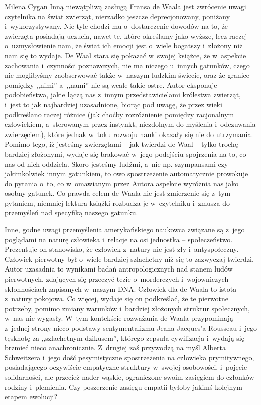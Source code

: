 \begin{recplenv}{Milena Cygan}
Inną niewątpliwą zasługą Fransa de Waala jest zwrócenie uwagi czytelnika na świat zwierząt, nierzadko jeszcze
deprecjonowany, poniżany i~wykorzystywany. Nie tyle chodzi mu o~dostarczenie dowodów na to, że zwierzęta posiadają
uczucia, nawet te, które określamy jako wyższe, lecz raczej o~uzmysłowienie nam, że świat ich emocji jest o~wiele
bogatszy i~złożony niż nam się to wydaje. De Waal stara się pokazać w~swojej książce, że w~aspekcie
zachowania i~czynności poznawczych, nie ma niczego u~innych gatunków, czego nie moglibyśmy zaobserwować także w~naszym ludzkim
świecie, oraz że granice pomiędzy ,,nimi'' a~,,nami'' nie są wcale takie ostre. Autor eksponuje podobieństwa, jakie łączą
nas z~innym przedstawicielami królestwa zwierząt, i~jest to jak najbardziej uzasadnione, biorąc pod uwagę, że przez
wieki podkreślano raczej różnice (jak choćby rozróżnienie pomiędzy racjonalnym człowiekiem, a~sterowanym przez
instynkt, niezdolnym do myślenia i~odczuwania zwierzęciem), które jednak w~toku rozwoju nauki okazały się nie do
utrzymania. Pomimo tego, iż jesteśmy zwierzętami -- jak twierdzi de Waal -- tylko trochę bardziej złożonymi, wydaje się
brakować w~jego podejściu spojrzenia na to, co nas od nich oddziela. Skoro jesteśmy ludźmi, a~nie np. szympansami czy
jakimkolwiek innym gatunkiem, to owo spostrzeżenie automatycznie prowokuje do pytania o~to, co w~omawianym przez Autora
aspekcie wyróżnia nas jako osobny gatunek. Co prawda celem de Waala nie jest zmierzenie się z~tym pytaniem, niemniej
lektura książki rozbudza je w~czytelniku i~zmusza do przemyśleń nad specyfiką naszego gatunku.

\enlargethispage{-.5\baselineskip}

Inne, godne uwagi przemyślenia amerykańskiego naukowca związane są z~jego poglądami na naturę człowieka i~relacje na osi
jednostka -- społeczeństwo. Prezentuje on stanowisko, że człowiek z~natury nie jest zły i~antyspołeczny. Człowiek
pierwotny był o~wiele bardziej szlachetny niż się to zazwyczaj twierdzi. Autor uzasadnia to wynikami badań
antropologicznych nad stanem ludów pierwotnych, zdających się przeczyć tezie o~morderczych i~wojowniczych skłonnościach
zapisanych w~naszym DNA. Człowiek dla de Waala to istota z~natury pokojowa. Co więcej, wydaje się on podkreślać, że te
pierwotne potrzeby, pomimo zmiany warunków i~bardziej złożonych struktur społecznych, w~nas nie wygasły. W~tym kontekście
rozważania de Waala przypominają z~jednej strony nieco podstawy sentymentalizmu Jeana-Jacques'a Rousseau i~jego tęsknotę za
,,szlachetnym dzikusem'', którego zepsuła cywilizacja i~wydają się brzmieć nieco anachronicznie. Z~drugiej zaś przywodzą
na myśl Alberta Schweitzera i~jego dość pesymistyczne spostrzeżenia na człowieka prymitywnego, posiadającego oczywiście
empatyczne struktury w~swojej osobowości, i~pojęcie solidarności, ale przecież nader wąskie, ograniczone swoim
zasięgiem do członków rodziny i~plemienia. Czy poszerzenie zasięgu empatii byłoby jakimś kolejnym etapem ewolucji?


\end{recplenv}
